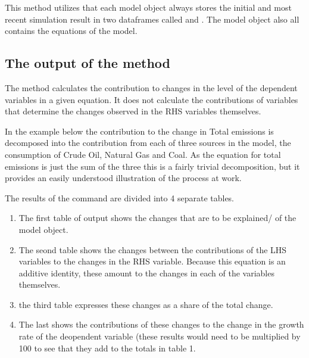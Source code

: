 \documentclass[letterpaper,10pt,english]{jupyterBook}
\begin{document}
\sphinxAtStartPar
This method utilizes that each model object always stores the initial and most recent simulation result in two dataframes called  and . The model object also all contains the equations of the model.


\subsection{The output of the  method}
\label{\detokenize{content/06_ModelAnalytics/Attribution:the-output-of-the-dekomp-method}}
\sphinxAtStartPar
The  method calculates the contribution to changes in the level of the dependent variables in a given equation. It does not calculate the contributions of variables that determine the changes observed in the RHS variables themselves.

\sphinxAtStartPar
In the example below the contribution to the change in Total emissions is decomposed into the contribution from each of three sources in the model, the consumption of Crude Oil, Natural Gas and Coal.  As the equation for total emissions is just the sum of the three this is a fairly trivial decomposition, but it provides an easily understood illustration of the process at work.

\sphinxAtStartPar
The results of the  command are divided into 4 separate tables.
\begin{enumerate}
%
\item {} 
\sphinxAtStartPar
The first table of output shows the changes that are to be explained/  of the model object.

\item {} 
\sphinxAtStartPar
The seond table shows the changes between the contributions of the LHS variables to the changes in the RHS variable.  Because this equation is an additive identity, these amount to the changes in each of the variables themselves.

\item {} 
\sphinxAtStartPar
the third table expresses these changes as a share of the total change.

\item {} 
\sphinxAtStartPar
The last shows the contributions of these changes to the change in the growth rate of the deopendent variable (these results would need to be multiplied by 100 to see that they add to the totals in table 1.

\end{enumerate}
\end{document}
